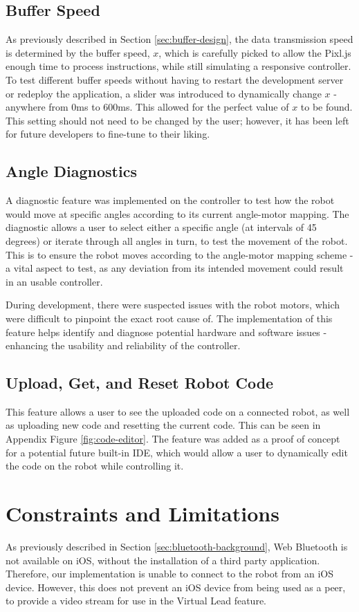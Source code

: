 \documentclass{l4proj}
\begin{document}
\subsection{Buffer Speed}
As previously described in Section \ref{sec:buffer-design}, the data transmission speed is determined by the buffer speed, $x$, which is carefully picked to allow the Pixl.js enough time to process instructions, while still simulating a responsive controller. To test different buffer speeds without having to restart the development server or redeploy the application, a slider was introduced to dynamically change $x$ - anywhere from 0ms to 600ms. This allowed for the perfect value of $x$ to be found. This setting should not need to be changed by the user; however, it has been left for future developers to fine-tune to their liking.

\subsection{Angle Diagnostics}
A diagnostic feature was implemented on the controller to test how the robot would move at specific angles according to its current angle-motor mapping. The diagnostic allows a user to select either a specific angle (at intervals of 45 degrees) or iterate through all angles in turn, to test the movement of the robot. This is to ensure the robot moves according to the angle-motor mapping scheme - a vital aspect to test, as any deviation from its intended movement could result in an usable controller.

During development, there were suspected issues with the robot motors, which were difficult to pinpoint the exact root cause of. The implementation of this feature helps identify and diagnose potential hardware and software issues - enhancing the usability and reliability of the controller.

\subsection{Upload, Get, and Reset Robot Code}
This feature allows a user to see the uploaded code on a connected robot, as well as uploading new code and resetting the current code. This can be seen in Appendix Figure \ref{fig:code-editor}. The feature was added as a proof of concept for a potential future built-in IDE, which would allow a user to dynamically edit the code on the robot while controlling it. 


\section{Constraints and Limitations}
As previously described in Section \ref{sec:bluetooth-background}, Web Bluetooth is not available on iOS, without the installation of a third party application. Therefore, our implementation is unable to connect to the robot from an iOS device. However, this does not prevent an iOS device from being used as a peer, to provide a video stream for use in the Virtual Lead feature.
\end{document}
